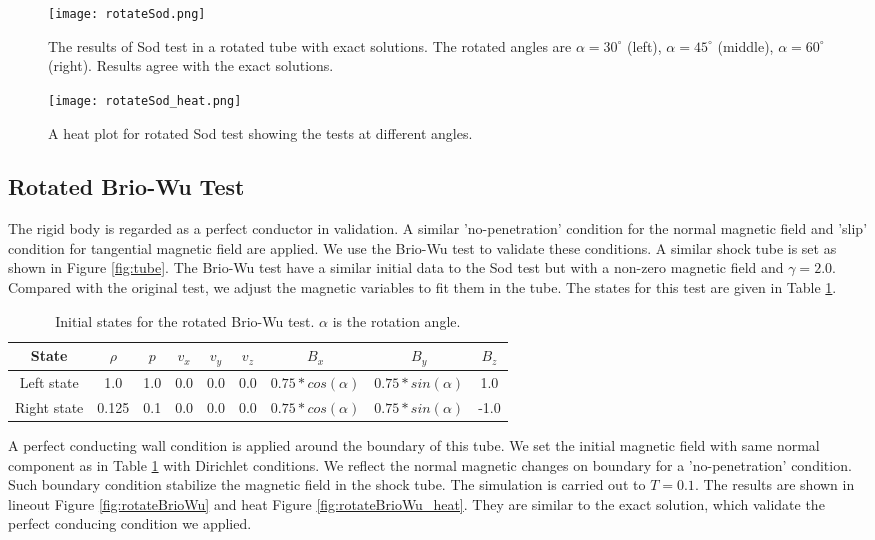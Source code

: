   \begin{figure}
      \centering
      \texttt{[image: rotateSod.png]}
      \caption[Lineout for rotated Sod test]{The results of Sod test in a rotated tube with exact solutions. The rotated angles are $\alpha=30^\circ$ (left), $\alpha=45^\circ$ (middle), $\alpha=60^\circ$ (right). Results agree with the exact solutions.}
      \label{fig:rotateSod}
  \end{figure}
  \begin{figure}
      \centering
      \texttt{[image: rotateSod\_heat.png]}
      \caption[Heat plot for rotated Sod test]{A heat plot for rotated Sod test showing the tests at different angles.}
      \label{fig:rotateSod_heat}
  \end{figure}
  
\subsection{Rotated Brio-Wu Test}
  The rigid body is regarded as a perfect conductor in validation. A similar 'no-penetration' condition for the normal magnetic field and 'slip' condition for tangential magnetic field are applied. We use the Brio-Wu test \cite{brio1988upwind} to validate these conditions. A similar shock tube is set as shown in Figure \ref{fig:tube}. The Brio-Wu test have a similar initial data to the Sod test but with a non-zero magnetic field and $\gamma=2.0$. Compared with the original test, we adjust the magnetic variables to fit them in the tube. The states for this test are given in Table \ref{tab:Brio}.
  \begin{table}[H]
\centering
\caption[Rotated Brio-Wu test]{Initial states for the rotated Brio-Wu test. $\alpha$ is the rotation angle.}
\begin{tabular}{|c|c|c|c|c|c|c|c|c|}
\hline
State & $\rho$ & $p$ & $v_x$ & $v_y$ & $v_z$ & $B_x$ & $B_y$ & $B_z$ \\
\hline
Left state & 1.0 & 1.0 & 0.0 & 0.0 & 0.0 & $0.75*cos(\alpha)$ & $0.75*sin(\alpha)$ & 1.0 \\
\hline
Right state & 0.125 & 0.1 & 0.0 & 0.0 & 0.0 & $0.75*cos(\alpha)$ & $0.75*sin(\alpha)$ & -1.0\\
\hline
\end{tabular}
\label{tab:Brio}
\end{table}
  A perfect conducting wall condition is applied around the boundary of this tube. We set the initial magnetic field with same normal component as in Table \ref{tab:Brio} with Dirichlet conditions. We reflect the normal magnetic changes on boundary for a 'no-penetration' condition. Such boundary condition stabilize the magnetic field in the shock tube. The simulation is carried out to $T=0.1$. The results are shown in lineout Figure \ref{fig:rotateBrioWu} and heat Figure \ref{fig:rotateBrioWu_heat}. They are similar to the exact solution, which validate the perfect conducing condition we applied. 
  

